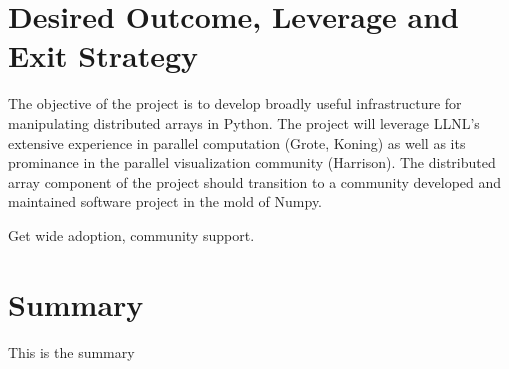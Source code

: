 \documentclass[letterpaper,11pt]{article}
\begin{document}
\section*{Desired Outcome, Leverage and Exit Strategy}

The objective of the project is to develop broadly useful infrastructure for manipulating distributed arrays in Python.  The project will leverage LLNL's extensive experience in parallel computation (Grote, Koning) as well as its prominance in the parallel visualization community (Harrison).   The distributed array component of the project should transition to a community developed and maintained software project in the mold of Numpy.

Get wide adoption, community support.



\section*{Summary}

This is the summary
\end{document}

